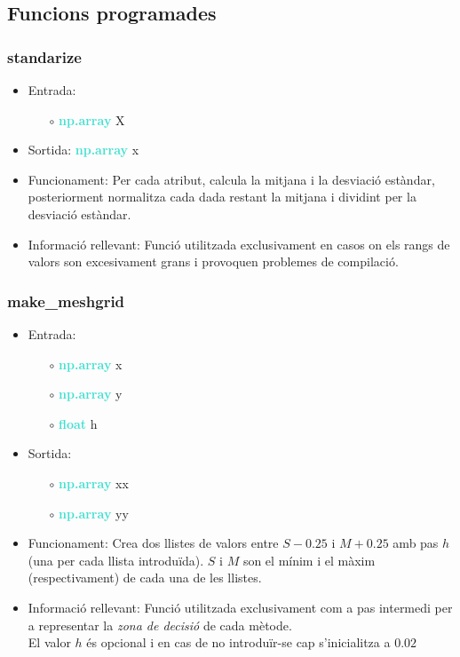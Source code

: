 \documentclass[a4paper, 11pt]{article}
\begin{document}
\newpage
\subsection{Funcions programades}
\subsubsection{standarize}
\begin{itemize}
    \item Entrada:
    \begin{itemize}
        \item [$\circ$] \textbf{\textcolor{Turquoise}{np.array}} X
    \end{itemize}
    \item Sortida: \textbf{\textcolor{Turquoise}{np.array}} x
    \item Funcionament: Per cada atribut, calcula la mitjana i la desviació estàndar, posteriorment normalitza cada dada restant la mitjana i dividint per la desviació estàndar.
    \item Informació rellevant: Funció utilitzada exclusivament en casos on els rangs de valors son excesivament grans i provoquen problemes de compilació. \label{standariza}
\end{itemize}
\subsubsection{make\_meshgrid}
\begin{itemize}
    \item Entrada:
    \begin{itemize}
        \item [$\circ$] \textbf{\textcolor{Turquoise}{np.array}} x
        \item [$\circ$] \textbf{\textcolor{Turquoise}{np.array}} y
        \item [$\circ$]  \textbf{\textcolor{Turquoise}{float}} h
    \end{itemize}
    \item Sortida: \begin{itemize}
        \item [$\circ$] \textbf{\textcolor{Turquoise}{np.array}} xx
        \item [$\circ$] \textbf{\textcolor{Turquoise}{np.array}} yy
    \end{itemize}
    \item Funcionament: Crea dos llistes de valors entre $S - 0.25$ i $M + 0.25$ amb pas $h$ (una per cada llista introduïda). $S$ i $M$ son el mínim i el màxim (respectivament) de cada una de les llistes.
    \item Informació rellevant: Funció utilitzada exclusivament com a pas intermedi per a representar la \textit{zona de decisió} de cada mètode.\\
    El valor $h$ és opcional i en cas de no introduïr-se cap s'inicialitza a $0.02$\label{meshgrid}
\end{itemize}
\end{document}
